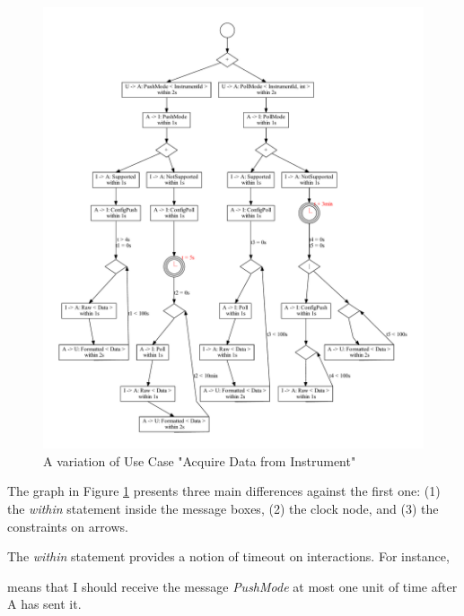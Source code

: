 \documentclass[a4paper,11pt,twoside]{report}
\begin{document}
\begin{figure}[p]
\begin{center}
\includegraphics[scale=0.44]{DataAcquisitionExample}
\end{center}
\caption{A variation of Use Case "Acquire Data from Instrument"}
\label{ooiwithdelay}
\end{figure}

The graph in Figure \ref{ooiwithdelay} presents three main differences against the first one: (1) the \emph{within} statement inside the message boxes, (2) the clock node, and (3) the constraints on arrows.

The \emph{within} statement provides a notion of timeout on interactions. For instance, 
\begin{center}
\end{center}
means that I should receive the message \emph{PushMode} at most one unit of time after A has sent it.
\end{document}
